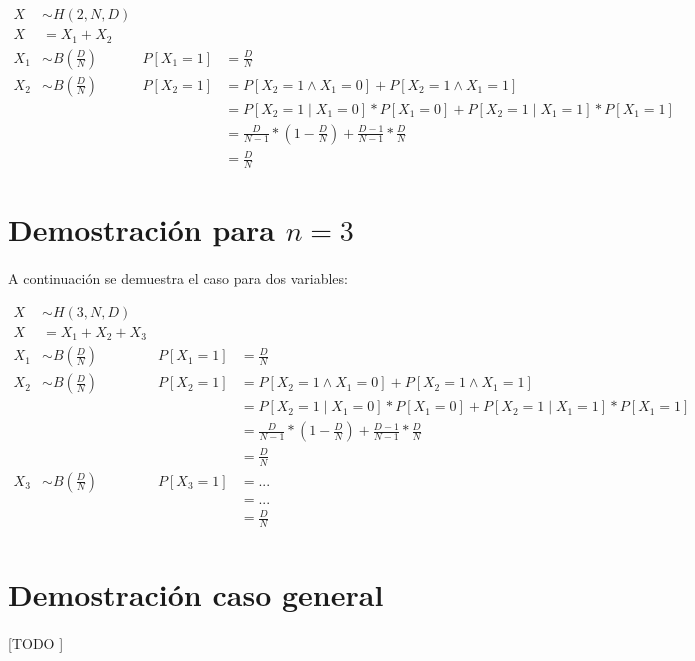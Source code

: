 \documentclass{article}
\begin{document}
    \begin{align}
      X   &\sim H(2, N, D)    &             &\\
      X   &= X_1 + X_2        &             &\\
      X_1 &\sim B(\frac{D}{N})& P[X_1 = 1]  &= \frac{D}{N}\\
      X_2 &\sim B(\frac{D}{N})& P[X_2 = 1]  &= P[X_2 = 1 \land X_1 = 0] + P[X_2 = 1 \land X_1 = 1] \\
          &                   &             &= P[X_2 = 1 \mid X_1 = 0]*P[X_1 = 0] + P[X_2 = 1 \mid X_1 = 1]*P[X_1 = 1] \\
          &                   &             &= \frac{D}{N-1}*(1-\frac{D}{N}) + \frac{D-1}{N-1}*\frac{D}{N} \\
          &                   &             &= \frac{D}{N}
    \end{align}

  \section{Demostración para $n=3$}
  \label{sec:demostration_1}

  \paragraph{}
  A continuación se demuestra el caso para dos variables:

  \begin{align}
    X   &\sim H(3, N, D)    &             &\\
    X   &= X_1 + X_2 + X_3  &             &\\
    X_1 &\sim B(\frac{D}{N})& P[X_1 = 1]  &= \frac{D}{N}\\
    X_2 &\sim B(\frac{D}{N})& P[X_2 = 1]  &= P[X_2 = 1 \land X_1 = 0] + P[X_2 = 1 \land X_1 = 1] \\
        &                   &             &= P[X_2 = 1 \mid X_1 = 0]*P[X_1 = 0] + P[X_2 = 1 \mid X_1 = 1]*P[X_1 = 1] \\
        &                   &             &= \frac{D}{N-1}*(1-\frac{D}{N}) + \frac{D-1}{N-1}*\frac{D}{N} \\
        &                   &             &= \frac{D}{N} \\
    X_3 &\sim B(\frac{D}{N})& P[X_3 = 1]  &= ... \\
        &                   &             &= ... \\
        &                   &             &= \frac{D}{N} \\
  \end{align}

  \section{Demostración caso general}
  \label{sec:demostration_1}

    \paragraph{}
    [TODO ]

	\nocite{muest2017}

  
  
\end{document}
